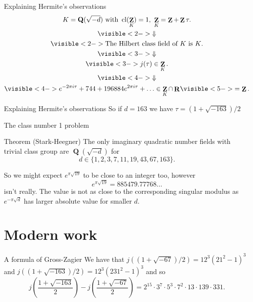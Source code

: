 \documentclass{beamer}
\DeclareMathOperator{\cl}{cl}
\DeclareMathOperator{\ZZ}{\mathbf{Z}}
\DeclareMathOperator{\QQ}{\mathbf{Q}}
\DeclareMathOperator{\RR}{\mathbf{R}}
\begin{document}
\begin{frame}{Explaining Hermite's observations}
\begin{gather*}
K = \QQ(\sqrt{-d}) \text{ with } \cl(\ZZ_K) = 1,\ \ZZ_K = \ZZ+\ZZ\tau.\\
\visible<2->{\Downarrow}\\
\visible<2->{\text{The Hilbert class field of $K$ is $K$}.}\\
\visible<3->{\Downarrow}\\
\visible<3->{j(\tau)\in \ZZ_K.}\\
\visible<4->{\Downarrow}\\
\visible<4->{e^{-2\pi i \tau} + 744 + 196884 e^{2\pi i \tau} + \ldots\in \ZZ_K\cap \RR}\visible<5->{ = \ZZ.}
\end{gather*}
\end{frame}

\begin{frame}{Explaining Hermite's observations}
So if $d= 163$ we have $\tau = (1 + \sqrt{-163})/2$

\end{frame}

\begin{frame}{The class number 1 problem}
\begin{block}{Theorem (Stark-Heegner)}
The only imaginary quadratic number fields with trivial class group are $\QQ(\sqrt{-d})$ for
\[d\in\{1,2,3,7,11,19,43,67,163\}.\]
\end{block}
\pause
So we might expect $e^{\pi\sqrt{19}}$ to be close to an integer too, however
\[
e^{\pi\sqrt{19}} = 885479.77768\ldots
\]
isn't really.
\pause The value is not as close to the corresponding singular modulus as $e^{-\pi\sqrt{d}}$ has larger absolute value for smaller $d$.
\end{frame}

\section{Modern work}
\begin{frame}{A formula of Gross-Zagier}
We have that $j((1+\sqrt{-67})/2) = 12^3(21^2 - 1)^3$ and $j((1+\sqrt{-163})/2) = 12^3(231^2 - 1)^3$ and so
\[
j\left(\frac{1+\sqrt{-163}}{2}\right) - j\left(\frac{1+\sqrt{-67}}{2}\right) = 2^{15}\cdot 3^7\cdot 5^3 \cdot 7^2\cdot 13\cdot 139\cdot 331.
\]


\end{frame}
\end{document}

